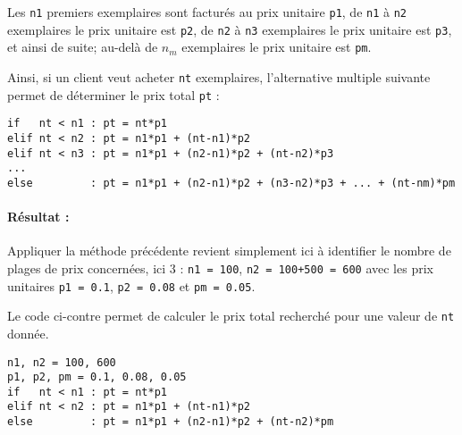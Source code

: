 \documentclass[11pt,a4paper]{article}
\begin{document}
\noindent\begin{minipage}{5cm}
Les \texttt{n1} premiers exemplaires sont facturés au prix unitaire \texttt{p1},
de \texttt{n1} à \texttt{n2} exemplaires le prix unitaire est \texttt{p2},
de \texttt{n2} à \texttt{n3} exemplaires le prix unitaire est \texttt{p3},
et ainsi de suite; 
au-delà de $n_m$ exemplaires le prix unitaire est \texttt{pm}.
\end{minipage}
\hfill
\begin{minipage}{10cm}
\end{minipage}

Ainsi, si un client veut acheter \texttt{nt} exemplaires, l'alternative multiple suivante permet
de déterminer le prix total \texttt{pt} :

\begin{Verbatim}
if   nt < n1 : pt = nt*p1
elif nt < n2 : pt = n1*p1 + (nt-n1)*p2
elif nt < n3 : pt = n1*p1 + (n2-n1)*p2 + (nt-n2)*p3
...
else         : pt = n1*p1 + (n2-n1)*p2 + (n3-n2)*p3 + ... + (nt-nm)*pm
\end{Verbatim}

\paragraph{Résultat :}
Appliquer la méthode précédente revient simplement ici à identifier le nombre de plages
de prix concernées, ici 3 : \texttt{n1 = 100}, \texttt{n2 = 100+500 = 600} 
avec les prix unitaires \texttt{p1 = 0.1}, \texttt{p2 = 0.08} et
\texttt{pm = 0.05}.


\noindent\begin{minipage}{3.5cm}
Le code \python{} ci-contre
permet de calculer le prix total recherché
pour une valeur de \texttt{nt} donnée.
\end{minipage}
\hfill
\begin{minipage}{11.5cm}\footnotesize
\begin{lstlisting}[caption=\textbf{prix de photocopies}]
n1, n2 = 100, 600
p1, p2, pm = 0.1, 0.08, 0.05
if   nt < n1 : pt = nt*p1
elif nt < n2 : pt = n1*p1 + (nt-n1)*p2
else         : pt = n1*p1 + (n2-n1)*p2 + (nt-n2)*pm
\end{lstlisting}
\end{minipage}
\end{document}
